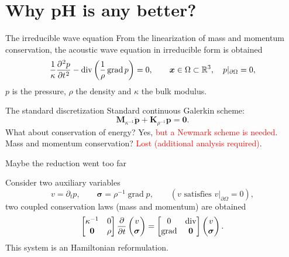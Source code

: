 \documentclass[aspectratio=169]{beamer}
\DeclareMathOperator*{\grad}{grad}
\renewcommand{\div}{\operatorname{div}}
\newcommand{\bbR}{\mathbb{R}}
\begin{document}
	
	\section{Why pH is any better?}
	
	
	\begin{frame}{The irreducible wave equation}
		From the linearization of mass and momentum conservation, the acoustic wave equation in irreducible form is obtained
		\begin{equation*}
			\frac{1}{\kappa} \diffp[2]{p}{t} - \div\left(\frac{1}{\rho}\grad p\right) = 0,  \qquad \bm{x} \in \Omega \subset \bbR^3, \quad p|_{\partial\Omega} =0,
		\end{equation*}
		$p$ is the pressure, $\rho$ the density and $\kappa$ the bulk modulus.
		
		
		\begin{block}{The standard discretization}
			Standard continuous Galerkin scheme:
			\begin{equation*}
				\mathbf{M}_{\kappa^{-1}} \ddot{\mathbf{p}} + \mathbf{K}_{\rho^{-1}} \mathbf{p} = \mathbf{0}.
			\end{equation*}
			What about conservation of energy? Yes, \textcolor{red}{but a Newmark scheme is needed}.\\
			Mass and momentum conservation? \textcolor{red}{Lost (additional analysis required)}.
		\end{block}
		
	\end{frame}
	
	\begin{frame}{Maybe the reduction went too far}
		\begin{overlayarea}{\textwidth}{\textheight}
			Consider two auxiliary variables
			\begin{equation*}
				v = \partial_t p, \qquad  \bm{\sigma} = \rho^{-1} \grad p, \qquad (v \text{ satisfies } v|_{\partial \Omega}=0),
			\end{equation*}
				two coupled conservation laws (mass and momentum) are obtained
				\begin{equation*}
					\begin{bmatrix}
						\kappa^{-1} & 0 \\
						\bm{0} & \rho 
					\end{bmatrix} \diffp{}{t}
					\begin{pmatrix}
						v \\ \bm{\sigma}
					\end{pmatrix} = 
					\begin{bmatrix}
						0 & \div \\
						\grad & \bm{0}
					\end{bmatrix}
					\begin{pmatrix}
						v \\ \bm{\sigma}
					\end{pmatrix}.
				\end{equation*}
				This system is an Hamiltonian reformulation.
			

		\end{overlayarea}
	\end{frame}
	
\end{document}
